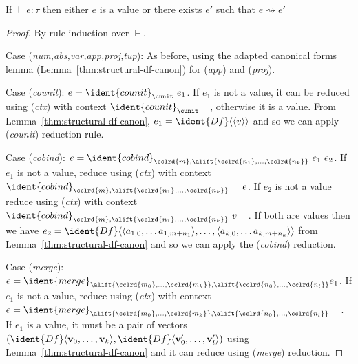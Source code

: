 \begin{theorem}[Progress]
\label{thm:structural-df-prog}
  If $\vdash e : \tau$ then either $e$ is a value or there exists $e'$ such that $e \rightsquigarrow e'$
\end{theorem}
\begin{proof}
  By rule induction over $\vdash$.

\vspace{0.25em}\noindent\hangindent=0.6cm
Case (\emph{num,abs,var,app,proj,tup}): As before, using the adapted canonical forms lemma
  (Lemma~\ref{thm:structural-df-canon}) for (\emph{app}) and (\emph{proj}).

\vspace{0.25em}\noindent\hangindent=0.6cm
Case (\emph{counit}): $e = {\ident{counit}_\cunit}~e_1$. If $e_1$ is not a value, it can be reduced
  using (\emph{ctx}) with context ${\ident{counit}_\cunit}~\_$, otherwise it is a value. From Lemma~\ref{thm:structural-df-canon},
  $e_1 = \ident{Df}\langle\langle v \rangle\rangle$ and so we can apply (\emph{counit}) reduction rule.

\vspace{0.25em}\noindent\hangindent=0.6cm
Case (\emph{cobind}): $e = \ident{cobind}_{\cclrd{m}, \alift{\cclrd{n_1},\ldots,\cclrd{n_k}}}~e_1~e_2$. If $e_1$ is not a value,
  reduce using (\emph{ctx}) with context ${\ident{cobind}_{\cclrd{m},\alift{\cclrd{n_1},\ldots,\cclrd{n_k}}}}~\_~e$. If $e_2$ is
  not a value reduce using (\emph{ctx}) with context ${\ident{cobind}_{\cclrd{m},\alift{\cclrd{n_1},\ldots,\cclrd{n_k}}}}~v~\_$.
  If both are values then we have
  $e_2 = \ident{Df}\langle \langle a_{1,0}, \ldots a_{1,m+{n_1}} \rangle, \ldots, \langle a_{k,0}, \ldots a_{k,m+{n_k}} \rangle \rangle$
  from Lemma~\ref{thm:structural-df-canon} and so we can apply the (\emph{cobind}) reduction.

\vspace{0.25em}\noindent\hangindent=0.6cm
Case (\emph{merge}): $e = \ident{merge}_{\alift{\cclrd{m_0},\ldots,\cclrd{m_k}}, \alift{\cclrd{n_0},\ldots,\cclrd{n_l}}} e_1$. If $e_1$ is not a value,
  reduce using (\emph{ctx}) with context $e = \ident{merge}_{\alift{\cclrd{m_0},\ldots,\cclrd{m_k}}, \alift{\cclrd{n_0},\ldots,\cclrd{n_l}}}~\_$. If $e_1$ is
  a value, it must be a pair of vectors $(\ident{Df}\langle \textbf{v}_0, \ldots, \textbf{v}_k \rangle, \ident{Df}\langle \textbf{v}'_0, \ldots, \textbf{v}'_l\rangle)$
  using Lemma~\ref{thm:structural-df-canon} and it can reduce using (\emph{merge}) reduction.


\end{proof}
